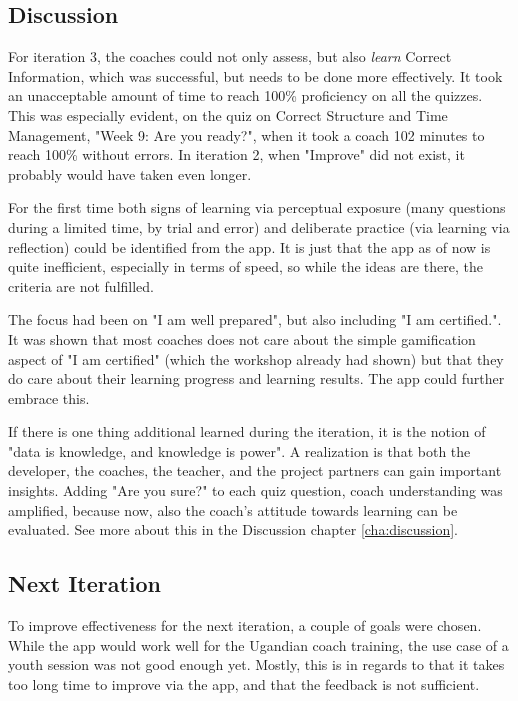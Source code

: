 \subsection{Discussion}

  For iteration 3, the coaches could not only assess, but also \textit{learn} Correct Information, which was successful, but needs to be done more effectively. It took an unacceptable amount of time to reach 100\% proficiency on all the quizzes. This was especially evident, on the quiz on Correct Structure and Time Management, "Week 9: Are you ready?", when it took a coach 102 minutes to reach 100\% without errors. In iteration 2, when "Improve" did not exist, it probably would have taken even longer.

  For the first time both signs of learning via perceptual exposure (many questions during a limited time, by trial and error) and deliberate practice (via learning via reflection) could be identified from the app. It is just that the app as of now is quite inefficient, especially in terms of speed, so while the ideas are there, the criteria are not fulfilled.

  The focus had been on "I am well prepared", but also including "I am certified.". It was shown that most coaches does not care about the simple gamification aspect of "I am certified" (which the workshop already had shown) but that they do care about their learning progress and learning results. The app could further embrace this.

  If there is one thing additional learned during the iteration, it is the notion of "data is knowledge, and knowledge is power". A realization is that both the developer, the coaches, the teacher, and the project partners can gain important insights. Adding "Are you sure?" to each quiz question, coach understanding was amplified, because now, also the coach's attitude towards learning can be evaluated. See more about this in the Discussion chapter \ref{cha:discussion}.

  \subsection{Next Iteration}
  To improve effectiveness for the next iteration, a couple of goals were chosen. While the app would work well for the Ugandian coach training, the use case of a youth session was not good enough yet. Mostly, this is in regards to that it takes too long time to improve via the app, and that the feedback is not sufficient.

